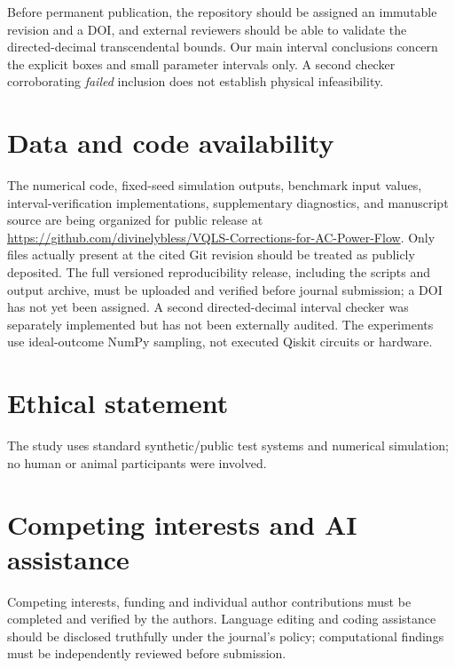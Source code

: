 \documentclass[11pt,a4paper]{article}
\theoremstyle{remark}\newtheorem{remark}[theorem]{Remark}
\begin{document}
Before permanent publication, the repository should be assigned an immutable revision and a DOI, and external reviewers should be able to validate the directed-decimal transcendental bounds. Our main interval conclusions concern the explicit boxes and small parameter intervals only. A second checker corroborating \emph{failed} inclusion does not establish physical infeasibility.

\section*{Data and code availability}
The numerical code, fixed-seed simulation outputs, benchmark input values, interval-verification implementations, supplementary diagnostics, and manuscript source are being organized for public release at \url{https://github.com/divinelybless/VQLS-Corrections-for-AC-Power-Flow}. Only files actually present at the cited Git revision should be treated as publicly deposited. The full versioned reproducibility release, including the scripts and output archive, must be uploaded and verified before journal submission; a DOI has not yet been assigned. A second directed-decimal interval checker was separately implemented but has not been externally audited. The experiments use ideal-outcome NumPy sampling, not executed Qiskit circuits or hardware.
\section*{Ethical statement}
The study uses standard synthetic/public test systems and numerical simulation; no human or animal participants were involved.
\section*{Competing interests and AI assistance}
Competing interests, funding and individual author contributions must be completed and verified by the authors. Language editing and coding assistance should be disclosed truthfully under the journal's policy; computational findings must be independently reviewed before submission.

\end{document}
